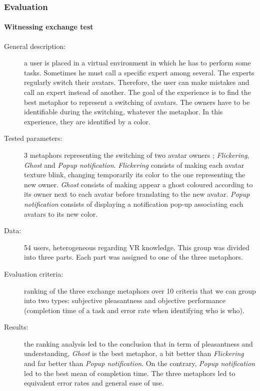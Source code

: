 \documentclass[a4paper]{article}
\begin{document}
\subsubsection{Evaluation}

\paragraph{Witnessing exchange test}
\begin{description}
	\item[General description:] a user is placed in a virtual environment in which he has to perform some tasks. Sometimes he must call a specific expert among several. The experts regularly switch their avatars. Therefore, the user can make mistakes and call an expert instead of another. The goal of the experience is to find the best metaphor to represent a switching of avatars. The owners have to be identifiable during the switching, whatever the metaphor. In this experience, they are identified by a color.
	\item[Tested parameters:] 3 metaphors representing the switching of two avatar owners ; \textit{Flickering}, \textit{Ghost} and \textit{Popup notification}. \textit{Flickering} consists of making each avatar texture blink, changing temporarily its color to the one representing the new owner. \textit{Ghost} consists of making appear a ghost coloured according to its owner next to each avatar before translating to the new avatar. \textit{Popup notification} consists of displaying a notification pop-up associating each avatars to its new color.
	\item[Data:] 54 users, heterogeneous regarding VR knowledge. This group was divided into three parts. Each part was assigned to one of the three metaphors.
	\item[Evaluation criteria:] ranking of the three exchange metaphors over 10 criteria that we can group into two types: subjective pleasantness and objective performance (completion time of a task and error rate when identifying who is who).
	\item[Results:] the ranking analysis led to the conclusion that in term of pleasantness and understanding, \textit{Ghost} is the best metaphor, a bit better than \textit{Flickering} and far better than \textit{Popup notification}. On the contrary, \textit{Popup notification} led to the best mean of completion time. The three metaphors led to equivalent error rates and general ease of use.
\end{description}
\end{document}
